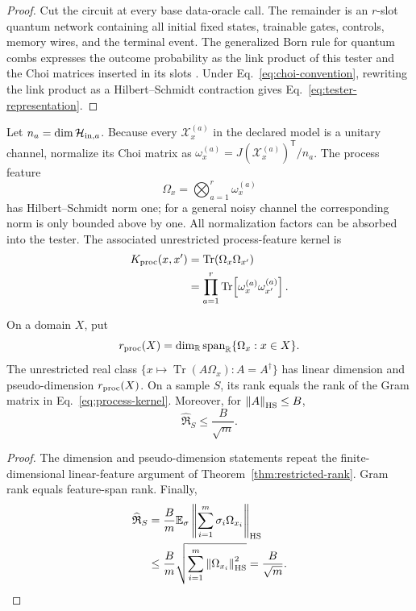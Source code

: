 \documentclass[pdflatex,sn-mathphys,NameDate,iicol]{sn-jnl}
\newcommand{\Tr}{\operatorname{Tr}}
\newcommand{\R}{\mathbb{R}}
\newcommand{\E}{\mathbb{E}}
\newcommand{\norm}[1]{\left\lVert #1\right\rVert}
\newcommand{\Rad}{\mathfrak{R}}
\newcommand{\cH}{\mathcal{H}}
\newcommand{\cX}{\mathcal{X}}
\begin{document}
\begin{proof}
Cut the circuit at every base data-oracle call. The remainder is an
$r$-slot quantum network containing all initial fixed states, trainable
gates, controls, memory wires, and the terminal event. The generalized Born
rule for quantum combs expresses the outcome probability as the link product
of this tester and the Choi matrices inserted in its slots
\citep{chiribella2009networks}. Under
Eq.~\eqref{eq:choi-convention}, rewriting the link product as a
Hilbert--Schmidt contraction gives
Eq.~\eqref{eq:tester-representation}.
\end{proof}

Let $n_a=\dim\cH_{{\rm in},a}$. Because every $\cX_x^{(a)}$ in the declared
model is a unitary channel, normalize its Choi matrix as
$\omega_x^{(a)}=J(\cX_x^{(a)})^{\mathsf T}/n_a$. The process feature
\begin{equation}
  \Omega_x=\bigotimes_{a=1}^{r}\omega_x^{(a)}
  \label{eq:normalized-process-feature}
\end{equation}
has Hilbert--Schmidt norm one; for a general noisy channel the corresponding
norm is only bounded above by one. All normalization factors can be absorbed
into the tester. The associated unrestricted process-feature kernel is
\begin{align}
 K_{\rm proc}(x,x')
 &=\Tr(\Omega_x\Omega_{x'})\nonumber\\
 &=\prod_{a=1}^{r}
   \Tr\!\left[\omega_x^{(a)}\omega_{x'}^{(a)}\right].
 \label{eq:process-kernel}
\end{align}

\begin{corollary}
\label{cor:process-capacity}
On a domain $X$, put
\begin{equation}
 r_{\rm proc}(X)
 =\dim_{\R}\operatorname{span}_{\R}\{\Omega_x:x\in X\}.
\end{equation}
The unrestricted real class
$\{x\mapsto\Tr(A\Omega_x):A=A^\dagger\}$ has linear dimension and
pseudo-dimension $r_{\rm proc}(X)$. On a sample $S$, its rank equals the
rank of the Gram matrix in Eq.~\eqref{eq:process-kernel}. Moreover, for
$\norm A_{\rm HS}\le B$,
\begin{equation}
 \widehat{\Rad}_S
 \le \frac{B}{\sqrt m}.
 \label{eq:process-rad}
\end{equation}
\end{corollary}

\begin{proof}
The dimension and pseudo-dimension statements repeat the finite-dimensional
linear-feature argument of Theorem~\ref{thm:restricted-rank}. Gram
rank equals feature-span rank. Finally,
\begin{align}
\widehat{\Rad}_S
&=\frac{B}{m}\E_\sigma
  \norm{\sum_{i=1}^m\sigma_i\Omega_{x_i}}_{\rm HS}\\
&\le\frac{B}{m}
 \sqrt{\sum_{i=1}^m\norm{\Omega_{x_i}}_{\rm HS}^2}
 =\frac{B}{\sqrt m}.
\end{align}
\end{proof}
\end{document}
